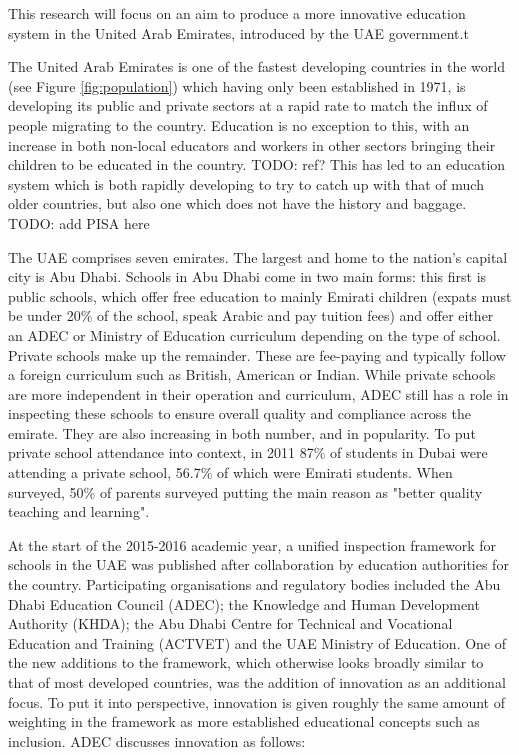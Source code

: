 This research will focus on an aim to produce a more innovative education system in the United Arab Emirates, introduced by the UAE government.t

The United Arab Emirates is one of the fastest developing countries in the world (see Figure \ref{fig:population}) which having only been established in 1971, is developing its public and private sectors at a rapid rate to match the influx of people migrating to the country. Education is no exception to this, with an increase in both non-local educators and workers in other sectors bringing their children to be educated in the country. TODO: ref? This has led to an education system which is both rapidly developing to try to catch up with that of much older countries, but also one which does not have the history and baggage. TODO: add PISA here

The UAE comprises seven emirates. The largest and home to the nation's capital city is Abu Dhabi. Schools in Abu Dhabi come in two main forms: this first is public schools, which offer free education to mainly Emirati children (expats must be under 20\% of the school, speak Arabic and pay tuition fees) and offer either an ADEC or Ministry of Education curriculum depending on the type of school. Private schools make up the remainder. These are fee-paying and typically follow a foreign curriculum such as British, American or Indian. While private schools are more independent in their operation and curriculum, ADEC still has a role in inspecting these schools to ensure overall quality and compliance across the emirate. They are also increasing in both number, and in popularity. To put private school attendance into context, in 2011 87\% of students in Dubai were attending a private school, 56.7\% of which were Emirati students. \cite[p.16]{Kenaid2011} When surveyed, 50\% of parents surveyed putting the main reason as "better quality teaching and learning". \cite[p.16]{Kenaid2011}

At the start of the 2015-2016 academic year, a unified inspection framework for schools in the UAE was published after collaboration by education authorities for the country. Participating organisations and regulatory bodies included the Abu Dhabi Education Council (ADEC); the Knowledge and Human Development Authority (KHDA); the Abu Dhabi Centre for Technical and Vocational Education and Training (ACTVET) and the UAE Ministry of Education. One of the new additions to the framework, which otherwise looks broadly similar to that of most developed countries, was the addition of innovation as an additional focus. To put it into perspective, innovation is given roughly the same amount of weighting in the framework as more established educational concepts such as inclusion. ADEC discusses innovation as follows:

